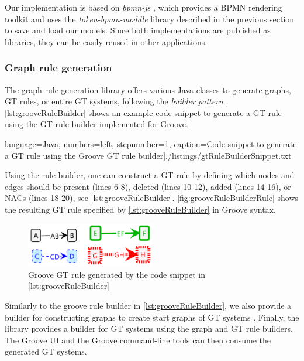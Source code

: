\documentclass{lmcs} %
\begin{document}
Our implementation is based on \textit{bpmn-js} \cite{camundaservicesgmbhBpmnjs2023}, which provides a BPMN rendering toolkit and uses the \textit{token-bpmn-moddle} library described in the previous section to save and load our models.
Since both implementations are published as libraries, they can be easily reused in other applications.

\subsubsection{Graph rule generation}
The graph-rule-generation library offers various Java classes to generate graphs, GT rules, or entire GT systems, following the \textit{builder pattern} \cite{gammaDesignPatternsElements1995}.
\autoref{lst:grooveRuleBuilder} shows an example code snippet to generate a GT rule using the GT rule builder implemented for Groove.

 language=Java, numbers=left,
    stepnumber=1, caption=Code snippet to generate a GT rule using the Groove GT rule builder]{./listings/gtRuleBuilderSnippet.txt}

Using the rule builder, one can construct a GT rule by defining which nodes and edges should be present (lines 6-8), deleted (lines 10-12), added (lines 14-16), or NACs (lines 18-20), see \autoref{lst:grooveRuleBuilder}.
\autoref{fig:grooveRuleBuilderRule} shows the resulting GT rule specified by \autoref{lst:grooveRuleBuilder} in Groove syntax.

\begin{figure}[ht]
    \centering
    \includegraphics[width=0.5\textwidth]{images/rule.pdf}
    \caption{Groove GT rule generated by the code snippet in \autoref{lst:grooveRuleBuilder}}
    \label{fig:grooveRuleBuilderRule}
\end{figure}

Similarly to the groove rule builder in \autoref{lst:grooveRuleBuilder}, we also provide a builder for constructing graphs to create start graphs of GT systems \cite{timkrauterLMCS2024Artifacts2023}.
Finally, the library provides a builder for GT systems using the graph and GT rule builders.
The Groove UI and the Groove command-line tools can then consume the generated GT systems.
\end{document}
